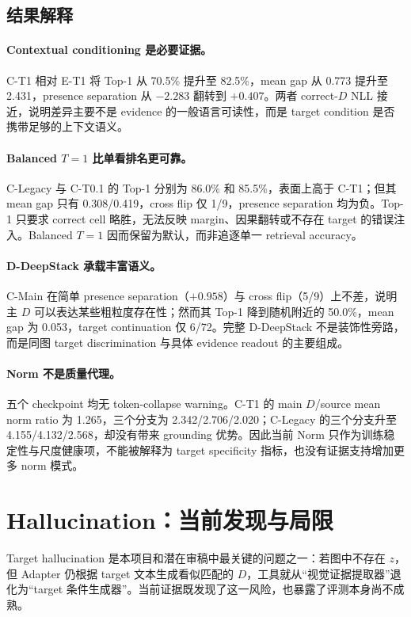 \documentclass[UTF8,twocolumn,10pt,a4paper]{ctexart}
\begin{document}
\subsection{结果解释}
\paragraph{Contextual conditioning 是必要证据。}
C-T1 相对 E-T1 将 Top-1 从 70.5\% 提升至 82.5\%，mean gap 从 0.773 提升至 2.431，presence separation 从 $-2.283$ 翻转到 $+0.407$。两者 correct-$D$ NLL 接近，说明差异主要不是 evidence 的一般语言可读性，而是 target condition 是否携带足够的上下文语义。

\paragraph{Balanced $T=1$ 比单看排名更可靠。}
C-Legacy 与 C-T0.1 的 Top-1 分别为 86.0\% 和 85.5\%，表面上高于 C-T1；但其 mean gap 只有 0.308/0.419，cross flip 仅 1/9，presence separation 均为负。Top-1 只要求 correct cell 略胜，无法反映 margin、因果翻转或不存在 target 的错误注入。Balanced $T=1$ 因而保留为默认，而非追逐单一 retrieval accuracy。

\paragraph{D-DeepStack 承载丰富语义。}
C-Main 在简单 presence separation（$+0.958$）与 cross flip（5/9）上不差，说明主 $D$ 可以表达某些粗粒度存在性；然而其 Top-1 降到随机附近的 50.0\%，mean gap 为 0.053，target continuation 仅 6/72。完整 D-DeepStack 不是装饰性旁路，而是同图 target discrimination 与具体 evidence readout 的主要组成。

\paragraph{Norm 不是质量代理。}
五个 checkpoint 均无 token-collapse warning。C-T1 的 main $D$/source mean norm ratio 为 1.265，三个分支为 2.342/2.706/2.020；C-Legacy 的三个分支升至 4.155/4.132/2.568，却没有带来 grounding 优势。因此当前 Norm 只作为训练稳定性与尺度健康项，不能被解释为 target specificity 指标，也没有证据支持增加更多 norm 模式。

\section{Hallucination：当前发现与局限}
Target hallucination 是本项目和潜在审稿中最关键的问题之一：若图中不存在 $z$，但 Adapter 仍根据 target 文本生成看似匹配的 $D$，工具就从“视觉证据提取器”退化为“target 条件生成器”。当前证据既发现了这一风险，也暴露了评测本身尚不成熟。
\end{document}
